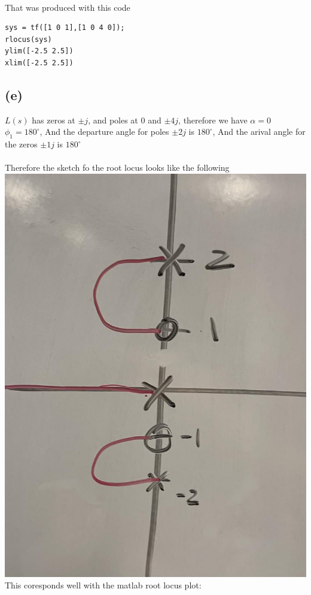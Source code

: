 \documentclass[12pt]{article}
\begin{document}
\\That was produced with this code
\begin{verbatim}
sys = tf([1 0 1],[1 0 4 0]);
rlocus(sys)
ylim([-2.5 2.5])
xlim([-2.5 2.5])
\end{verbatim}

\subsection*{(e)}
$L(s)$ has zeros at $\pm j$, and poles at $0$ and $\pm4j$, therefore we have $\alpha=0$
$\phi_{1}=180^{\circ}$, 
And the departure angle for poles $\pm2j$ is $180^{\circ}$, And the arival angle for the zeros $\pm1j$ is $180^{\circ}$\\\\
Therefore the sketch fo the root locus looks like the following
\\
\includegraphics[scale=.15]{Problem1Sketch2.jpg}
\\This coresponds well with the matlab root locus plot:\\
\end{document}
